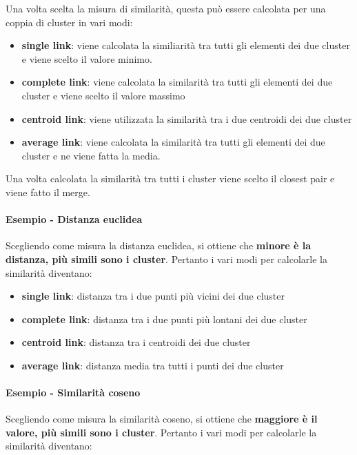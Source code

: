 Una volta scelta la misura di similarità, questa può essere calcolata per una coppia di cluster in vari modi:

\begin{itemize}
\item
  \textbf{single link}: viene calcolata la similiarità tra tutti gli elementi dei due cluster e viene scelto il valore minimo.
\item
  \textbf{complete link}: viene calcolata la similarità tra tutti gli elementi dei due cluster e viene scelto il valore massimo
\item
  \textbf{centroid link}: viene utilizzata la similarità tra i due centroidi dei due cluster
\item
  \textbf{average link}: viene calcolata la similarità tra tutti gli elementi dei due cluster e ne viene fatta la media.
\end{itemize}

Una volta calcolata la similarità tra tutti i cluster viene scelto il closest pair e viene fatto il merge.

\paragraph{Esempio - Distanza euclidea}

Scegliendo come misura la distanza euclidea, si ottiene che \textbf{minore è la distanza, più simili sono i cluster}. Pertanto i vari modi per calcolarle la similarità diventano:

\begin{itemize}
	\item
	\textbf{single link}: distanza tra i due punti più vicini dei due cluster
	\item
	\textbf{complete link}: distanza tra i due punti più lontani dei due cluster
	\item
	\textbf{centroid link}: distanza tra i centroidi dei due cluster
	\item
	\textbf{average link}: distanza media tra tutti i punti dei due cluster
\end{itemize}

\paragraph{Esempio - Similarità coseno}

Scegliendo come misura la similarità coseno, si ottiene che \textbf{maggiore è il valore, più simili sono i cluster}. Pertanto i vari modi per calcolarle la similarità diventano:

